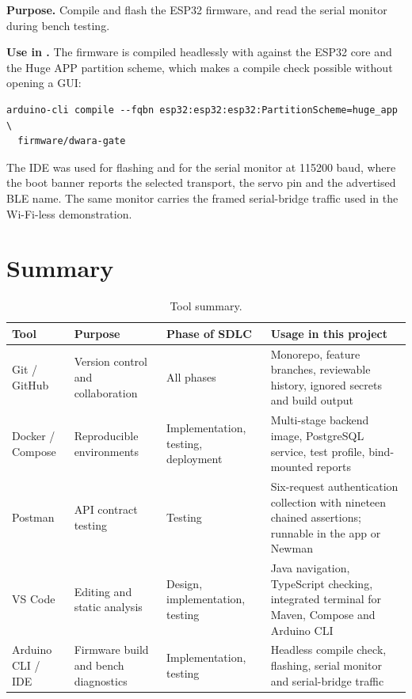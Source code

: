 \textbf{Purpose.} Compile and flash the ESP32 firmware, and read the serial monitor
during bench testing.

\textbf{Use in \project{}.} The firmware is compiled headlessly with
 against the ESP32 core and the Huge APP partition scheme, which
makes a compile check possible without opening a GUI:

\begin{lstlisting}[style=bash,caption={Firmware compile check used after every firmware
change.},label={lst:compile}]
arduino-cli compile --fqbn esp32:esp32:esp32:PartitionScheme=huge_app \
  firmware/dwara-gate
\end{lstlisting}

The IDE was used for flashing and for the serial monitor at 115200 baud, where the
boot banner reports the selected transport, the servo pin and the advertised BLE
name. The same monitor carries the framed serial-bridge traffic used in the Wi-Fi-less
demonstration.


\section{Summary}

\begin{table}[htbp]
  \centering
  \small
  \begin{tabularx}{\textwidth}{@{}lXXX@{}}
    \toprule
    \textbf{Tool} & \textbf{Purpose} & \textbf{Phase of SDLC} &
    \textbf{Usage in this project} \\
    \midrule
    Git / GitHub & Version control and collaboration & All phases &
      Monorepo, feature branches, reviewable history, ignored secrets and build
      output \\
    Docker / Compose & Reproducible environments & Implementation, testing,
      deployment & Multi-stage backend image, PostgreSQL service, test profile,
      bind-mounted reports \\
    Postman & API contract testing & Testing & Six-request authentication
      collection with nineteen chained assertions; runnable in the app or Newman \\
    VS Code & Editing and static analysis & Design, implementation, testing &
      Java navigation, TypeScript checking, integrated terminal for Maven, Compose
      and Arduino CLI \\
    Arduino CLI / IDE & Firmware build and bench diagnostics & Implementation,
      testing & Headless compile check, flashing, serial monitor and serial-bridge
      traffic \\
    \bottomrule
  \end{tabularx}
  \caption{Tool summary.}
  \label{tab:tool-summary}
\end{table}
